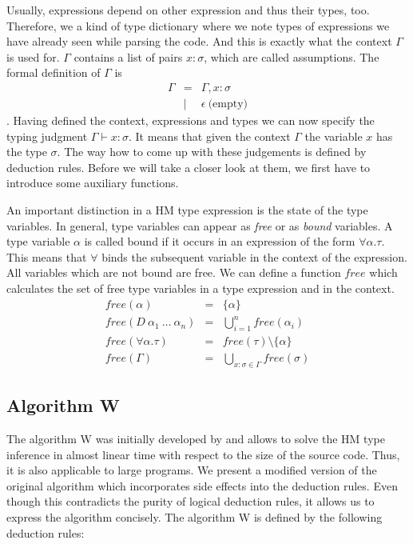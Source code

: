 Usually, expressions depend on other expression and thus their types, too.
Therefore, we a kind of type dictionary where we note types of expressions we have already seen while parsing the code.
And this is exactly what the context $\Gamma$ is used for.
$\Gamma$ contains a list of pairs $x:\sigma$, which are called assumptions.
The formal definition of $\Gamma$ is
\begin{eqnarray*}
\Gamma &=& \Gamma, x:\sigma \\
&|& \epsilon\ \text{(empty)}
\end{eqnarray*}
.
Having defined the context, expressions and types we can now specify the typing judgment $\Gamma \vdash x : \sigma$.
It means that given the context $\Gamma$ the variable $x$ has the type $\sigma$.
The way how to come up with these judgements is defined by deduction rules.
Before we will take a closer look at them, we first have to introduce some auxiliary functions.

An important distinction in a HM type expression is the state of the type variables.
In general, type variables can appear as \emph{free} or as \emph{bound} variables.
A type variable $\alpha$ is called bound if it occurs in an expression of the form $\forall \alpha. \tau$.
This means that $\forall$ binds the subsequent variable in the context of the expression.
All variables which are not bound are free.
We can define a function $free$ which calculates the set of free type variables in a type expression and in the context.
\begin{eqnarray*}
free(\alpha) &=& \{\alpha\}\\
free(D\ \alpha_1\ \ldots\ \alpha_n) &=& \bigcup_{i=1}^n free(\alpha_i)\\
free(\forall \alpha. \tau) &=& free(\tau) \setminus \{\alpha\}\\
free(\Gamma) &=& \bigcup_{x:\sigma \in \Gamma} free(\sigma)
\end{eqnarray*}

\subsection{Algorithm W}

The algorithm W was initially developed by \textcite{damas:1982a} and allows to solve the HM type inference in almost linear time with respect to the size of the source code.
Thus, it is also applicable to large programs.
We present a modified version of the original algorithm which incorporates side effects into the deduction rules.
Even though this contradicts the purity of logical deduction rules, it allows us to express the algorithm concisely.
The algorithm W is defined by the following deduction rules:

